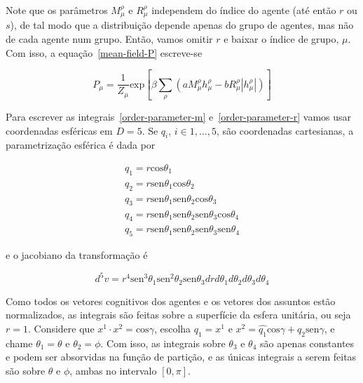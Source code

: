 \documentclass[a4paper, 11pt]{article} %
\newcommand{\Mh}[1]{\ensuremath{\displaystyle%
    M^{\rho}_{#1}}}
\newcommand{\Rh}[1]{\ensuremath{\displaystyle%
    R^{\rho}_{#1}}}
\newcommand{\inp}[1]{\ensuremath{\displaystyle%
    \left(#1\right)}}
\newcommand{\ins}[1]{\ensuremath{\displaystyle%
    \left[#1\right]}}
\begin{document}
Note que os parâmetros $\Mh{\mu}$ e $\Rh{\mu}$ independem do índice do agente 
(até então $r$ ou $s$), de tal modo que a distribuição depende apenas do grupo 
de agentes, mas não de cada agente num grupo. Então, vamos omitir $r$ e  baixar 
o índice de grupo, $\mu$. Com isso, a equação~\ref{mean-field-P} escreve-se 

\newcommand{\hf}[2]{%
    h_{#1}^{#2}}

\begin{equation} 
    P_{\mu} = \frac{1}{Z_{\mu}} \mathrm{exp} \ins{%
    \beta \sum_{\rho} \inp{a\Mh{\mu}\hf{\mu}{\rho} - b\Rh{\mu}|\hf{\mu}{\rho}|}}
\end{equation}

Para escrever as integrais~\ref{order-parameter-m} e~\ref{order-parameter-r}
vamos usar coordenadas esféricas em $D=5$. Se $q_{i}$, $i \in {1,\ldots,5}$, 
são coordenadas cartesianas, a parametrização esférica é dada por 

\newcommand{\cos}{\mathrm{cos}}
\newcommand{\sen}{\mathrm{sen}}

\begin{equation*}
    \begin{align}
        q_1 = r \cos \theta _1 \\
        q_2 = r \sen \theta _1 \cos \theta _2 \\
        q_3 = r \sen \theta _1 \sen \theta _2 \cos \theta _3 \\
        q_4 = r \sen \theta _1 \sen \theta _2 \sen \theta _3 \cos \theta _4 \\
        q_5 = r \sen \theta _1 \sen \theta _2 \sen \theta _3 \sen \theta _4
    \end{align}
\end{equation*}

e o jacobiano da transformação é 

\begin{equation*}
    d^5 v = r^4 \sen ^3 \theta _1 \sen ^2 \theta _2 \sen \theta _3 
    drd\theta_1d\theta_2d\theta_3d\theta_4
\end{equation*}

Como todos os vetores cognitivos dos agentes e os vetores dos assuntos estão
normalizados, as integrais são feitas sobre a superfície da esfera unitária, ou
seja $r=1$. Considere que $x^1 \cdot x^2 = \cos \gamma$, escolha $q_1 =
x^1$ e $ x^2 = \hat{q_1}\cos \gamma  + \hat{q_2}\sen \gamma $, e 
chame $\theta_1 = \theta$ e $\theta_2 = \phi$. Com isso, as integrais sobre
$\theta_3$ e $\theta_4$ são apenas constantes e podem ser absorvidas na função
de partição, e as únicas integrais a serem feitas são sobre $\theta$ e $\phi$, 
ambas no intervalo $[0,\pi]$. 
\end{document}
